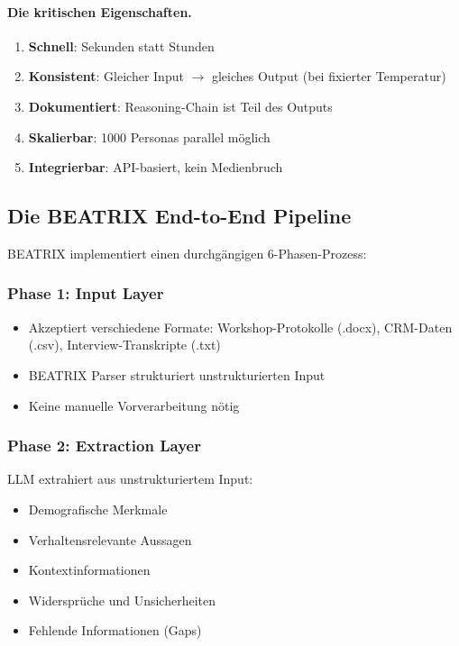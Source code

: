 \paragraph{Die kritischen Eigenschaften.}
\begin{enumerate}
    \item \textbf{Schnell}: Sekunden statt Stunden
    \item \textbf{Konsistent}: Gleicher Input $\rightarrow$ gleiches Output (bei fixierter Temperatur)
    \item \textbf{Dokumentiert}: Reasoning-Chain ist Teil des Outputs
    \item \textbf{Skalierbar}: 1000 Personas parallel möglich
    \item \textbf{Integrierbar}: API-basiert, kein Medienbruch
\end{enumerate}

\subsection{Die BEATRIX End-to-End Pipeline}

BEATRIX implementiert einen durchgängigen 6-Phasen-Prozess:

\subsubsection{Phase 1: Input Layer}

\begin{itemize}
    \item Akzeptiert verschiedene Formate: Workshop-Protokolle (.docx), CRM-Daten (.csv), Interview-Transkripte (.txt)
    \item BEATRIX Parser strukturiert unstrukturierten Input
    \item Keine manuelle Vorverarbeitung nötig
\end{itemize}

\subsubsection{Phase 2: Extraction Layer}

LLM extrahiert aus unstrukturiertem Input:
\begin{itemize}
    \item Demografische Merkmale
    \item Verhaltensrelevante Aussagen
    \item Kontextinformationen
    \item Widersprüche und Unsicherheiten
    \item Fehlende Informationen (Gaps)
\end{itemize}

